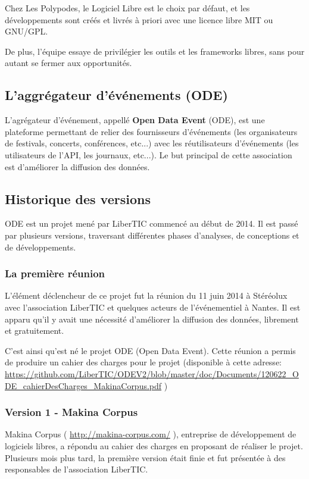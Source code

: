 Chez Les Polypodes, le Logiciel Libre est le choix par défaut, et les développements sont créés et livrés à priori avec une licence libre MIT ou GNU/GPL.

De plus, l'équipe essaye de privilégier les outils et les frameworks libres, sans pour autant se fermer aux opportunités.

\subsection{L'aggrégateur d'événements (ODE)}

L'agrégateur d'événement, appellé \textbf{Open Data Event} (ODE), est une plateforme permettant de relier des fournisseurs d'événements  (les organisateurs de festivals, concerts, conférences, etc...) avec les réutilisateurs d’événements (les utilisateurs de l’API, les journaux, etc...). Le but principal de cette association est d'améliorer la diffusion des données.

\subsection{Historique des versions}

ODE est un projet mené par LiberTIC commencé au début de 2014. Il est passé par plusieurs versions, traversant différentes phases d'analyses, de conceptions et de développements.

\subsubsection*{La première réunion}

L'élément déclencheur de ce projet fut la réunion du 11 juin 2014 à Stéréolux avec l'association LiberTIC et quelques acteurs de l'événementiel à Nantes. Il est apparu qu'il y avait une nécessité d'améliorer la diffusion des données, librement et gratuitement.

C'est ainsi qu'est né le projet ODE (Open Data Event). Cette réunion a permis de produire un cahier des charges pour le projet (disponible à cette adresse: \url{https://github.com/LiberTIC/ODEV2/blob/master/doc/Documents/120622_ODE_cahierDesCharges_MakinaCorpus.pdf} )

\subsubsection*{Version 1 - Makina Corpus}

Makina Corpus ( \url{http://makina-corpus.com/} ), entreprise de développement de logiciels libres, a répondu au cahier des charges en proposant de réaliser le projet. Plusieurs mois plus tard, la première version était finie et fut présentée à des responsables de l'association LiberTIC.


